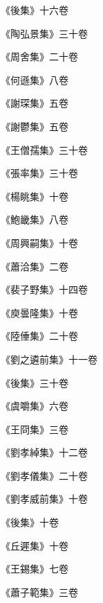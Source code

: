 \begin{pinyinscope}
 《後集》十六卷



 《陶弘景集》三十卷



 《周舍集》二十卷



 《何遜集》八卷



 《謝琛集》五卷



 《謝鬱集》五卷



 《王僧孺集》三十卷



 《張率集》三十卷



 《楊眺集》十卷



 《鮑畿集》八卷



 《周興嗣集》十卷



 《蕭洽集》二卷



 《裴子野集》十四卷



 《庾曇隆集》十卷



 《陸倕集》二十卷



 《劉之遴前集》十一卷



 《後集》三十卷



 《虞嚼集》六卷



 《王冏集》三卷



 《劉孝綽集》十二卷



 《劉孝儀集》二十卷



 《劉孝威前集》十卷



 《後集》十卷



 《丘遲集》十卷



 《王錫集》七卷



 《蕭子範集》三卷




\end{pinyinscope}
